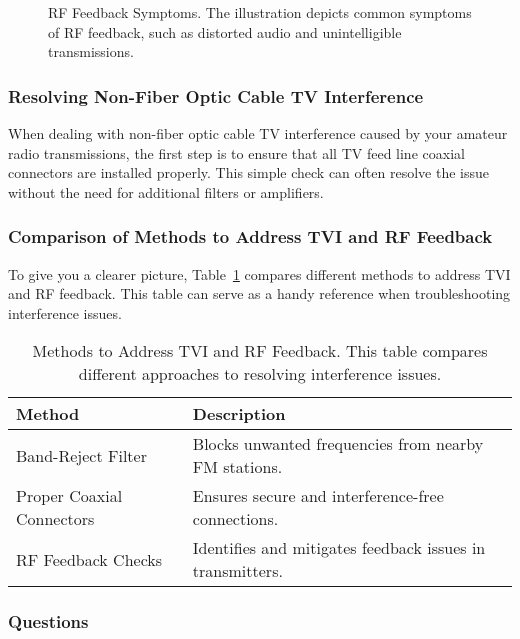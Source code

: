 \begin{figure}[h]
    \centering
    \caption{RF Feedback Symptoms. The illustration depicts common symptoms of RF feedback, such as distorted audio and unintelligible transmissions.}
    \label{fig:rf-feedback}
\end{figure}

\subsubsection*{Resolving Non-Fiber Optic Cable TV Interference}

When dealing with non-fiber optic cable TV interference caused by your amateur radio transmissions, the first step is to ensure that all TV feed line coaxial connectors are installed properly. This simple check can often resolve the issue without the need for additional filters or amplifiers.

\subsubsection*{Comparison of Methods to Address TVI and RF Feedback}

To give you a clearer picture, Table~\ref{tab:tvi-rf-feedback} compares different methods to address TVI and RF feedback. This table can serve as a handy reference when troubleshooting interference issues.

\begin{table}[h]
    \centering
    \begin{tabular}{|l|l|}
        \hline
        \textbf{Method} & \textbf{Description} \\
        \hline
        Band-Reject Filter & Blocks unwanted frequencies from nearby FM stations. \\
        Proper Coaxial Connectors & Ensures secure and interference-free connections. \\
        RF Feedback Checks & Identifies and mitigates feedback issues in transmitters. \\
        \hline
    \end{tabular}
    \caption{Methods to Address TVI and RF Feedback. This table compares different approaches to resolving interference issues.}
    \label{tab:tvi-rf-feedback}
\end{table}

\subsubsection{Questions}

